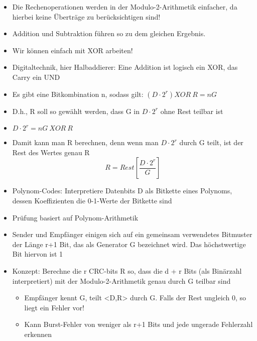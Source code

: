 \begin{itemize}
    \item Die Rechenoperationen werden in der Modulo-2-Arithmetik einfacher, da hierbei keine Überträge zu berücksichtigen sind!
    \item Addition und Subtraktion führen so zu dem gleichen Ergebnis.
    \item Wir können einfach mit XOR arbeiten!
    \item Digitaltechnik, hier Halbaddierer: Eine Addition ist logisch ein XOR, das Carry ein UND
    \item Es gibt eine Bitkombination n, sodass gilt: $(D \cdot 2^r) XOR \ R = n G$
    \item D.h., R soll so gewählt werden, dass G in $D \cdot 2^r$ ohne Rest teilbar ist
    \item $D \cdot 2^r = nG \ XOR \ R$
    \item Damit kann man R berechnen, denn wenn man $D \cdot 2^r$ durch G teilt, ist der Rest des Wertes genau R
    \[R = Rest\left[\frac{D \cdot 2^r}{G}\right]\]
\end{itemize}

\begin{itemize}
    \item Polynom-Codes: Interpretiere Datenbits D als Bitkette eines Polynoms, dessen Koeffizienten die 0-1-Werte der Bitkette sind
    \item Prüfung basiert auf Polynom-Arithmetik
    \item Sender und Empfänger einigen sich auf ein gemeinsam verwendetes Bitmuster der Länge r+1 Bit, das als Generator G bezeichnet wird. Das höchstwertige Bit hiervon ist 1
    \item Konzept: Berechne die r CRC-bits R so, dass die d + r Bits (als Binärzahl interpretiert) mit der Modulo-2-Arithmetik genau durch G teilbar sind
    \begin{itemize}
        \item Empfänger kennt G, teilt <D,R> durch G. Falls der Rest ungleich 0, so liegt ein Fehler vor!
        \item Kann Burst-Fehler von weniger als r+1 Bits und jede ungerade Fehlerzahl erkennen
    \end{itemize}
\end{itemize}
